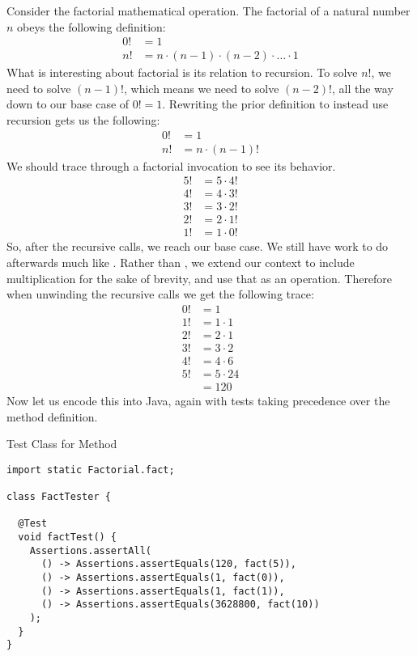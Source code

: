 \example Consider the factorial mathematical operation. The factorial of a natural number $n$ obeys the following definition:
\begin{align*}
    0! &= 1\\
    n! &= n \cdot (n - 1) \cdot (n - 2) \cdot \ldots \cdot 1
\end{align*}
What is interesting about factorial is its relation to recursion. To solve $n!$, we need to solve $(n-1)!$, which means we need to solve $(n-2)!$, all the way down to our base case of $0!=1$. Rewriting the prior definition to instead use recursion gets us the following: 
\begin{align*}
    0! &= 1\\
    n! &= n \cdot (n - 1)!
\end{align*}
We should trace through a factorial invocation to see its behavior.
\begin{align*}
    5! &= 5 \cdot 4!\\
    4! &= 4 \cdot 3!\\
    3! &= 3 \cdot 2!\\
    2! &= 2 \cdot 1!\\
    1! &= 1 \cdot 0!
\end{align*}
So, after the recursive calls, we reach our base case. We still have work to do afterwards much like . Rather than , we extend our context to include multiplication for the sake of brevity, and use that as an operation. Therefore when unwinding the recursive calls we get the following trace:
\begin{align*}
0! &= 1\\
1! &= 1 \cdot 1\\
2! &= 2 \cdot 1\\
3! &= 3 \cdot 2\\
4! &= 4 \cdot 6\\
5! &= 5 \cdot 24\\
   &= 120
\end{align*}
Now let us encode this into Java, again with tests taking precedence over the method definition.
\begin{cl}[]{Test Class for  Method}
\begin{lstlisting}[language=MyJava]
import static Factorial.fact;

class FactTester {
  
  @Test
  void factTest() {
    Assertions.assertAll(
      () -> Assertions.assertEquals(120, fact(5)),
      () -> Assertions.assertEquals(1, fact(0)),
      () -> Assertions.assertEquals(1, fact(1)),
      () -> Assertions.assertEquals(3628800, fact(10))
    );
  }
}
\end{lstlisting}
\end{cl}
